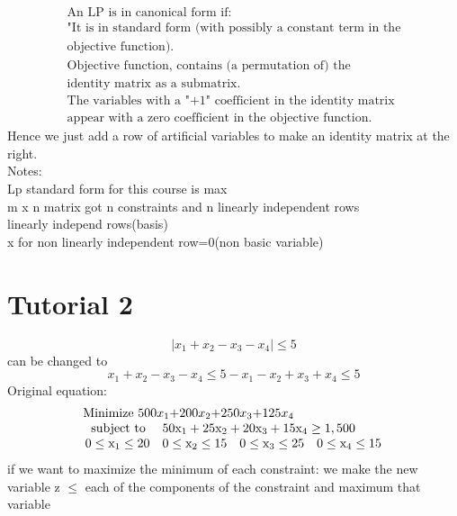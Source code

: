 \documentclass{article}
\begin{document}
$$
\begin{array} { l } { \text { An LP is in canonical form if: } } \\ { \text { "It is in standard form (with possibly a constant term in the } } \\ { \text { objective function). } } \\ { \text { Objective function, contains (a permutation of) the } } \\ { \text { identity matrix as a submatrix. } } \\ { \text { The variables with a "+1" coefficient in the identity matrix } } \\ { \text { appear with a zero coefficient in the objective function. } } \end{array}
$$
Hence we just add a row of artificial variables to make an identity matrix at the right.\\
Notes:\\
Lp standard form for this course is max\\
m x n matrix got n constraints and n linearly independent rows\\
linearly independ rows(basis)\\
x for non linearly independent row=0(non basic variable)\\
\section{Tutorial 2}
$$
|{x_1 + x_2 - x_3 - x_4}|\leq 5
$$
can be changed to
$$
x_1 + x_2 - x_3 - x_4 \leq 5
-x_1 - x_2 + x_3 + x_4 \leq 5
$$
Original equation:
$$
\begin{array} { l } { \text { Minimize 500$x_1$+200$x_2$+250$x_3$+125$x_4$} } \\ { \begin{array} { r l } { \text { subject to } } & { 50 \mathrm { x } _ { 1 } + 25 \mathrm { x } _ { 2 } + 20 \mathrm { x } _ { 3 } + 15 \mathrm { x } _ { 4 } \geq 1,500 } \\ { 0 \leq \mathrm { x } _ { 1 } \leq 20 } & { 0 \leq \mathrm { x } _ { 2 } \leq 15 \quad 0 \leq \mathrm { x } _ { 3 } \leq 25 \quad 0 \leq \mathrm { x } _ { 4 } \leq 15 } \end{array} } \end{array}
$$
if we want to maximize the minimum of each constraint:
we make the new variable z $\leq$ each of the components of the constraint and maximum that variable
\end{document}
